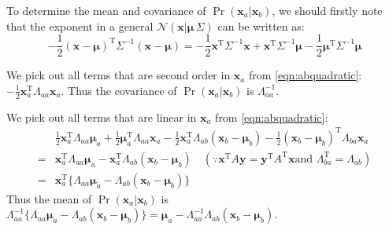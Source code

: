 To determine the mean and covariance of
$\Pr(\mathbf{x}_{a}\vert\mathbf{x}_{b})$, we should firstly note that
the exponent in a general
$\mathcal{N}(\mathbf{x}\vert\boldsymbol{\mu}\,\Sigma)$ can be written
as:
\begin{equation}
-\frac{1}{2}(\mathbf{x}-\boldsymbol{\mu})^{\mathrm{T}}\Sigma^{-1}(\mathbf{x}-\boldsymbol{\mu})=-\frac{1}{2}\mathbf{x}^{\mathrm{T}}\Sigma^{-1}\mathbf{x}+\mathbf{x}^{\mathrm{T}}\Sigma^{-1}\boldsymbol{\mu}-\frac{1}{2}\boldsymbol{\mu}^{\mathrm{T}}\Sigma^{-1}\boldsymbol{\mu}
\label{eqn:expandexponent}
\end{equation}


We pick out all terms that are second order in $\mathbf{x}_{a}$ from
\eqref{eqn:abquadratic}:
$-\frac{1}{2}\mathbf{x}_{a}^{\mathrm{T}}\Lambda_{aa}\mathbf{x}_{a}$.
Thus the covariance of $\Pr(\mathbf{x}_{a}\vert\mathbf{x}_{b})$ is
$\Lambda_{aa}^{-1}$.


We pick out all terms that are linear in $\mathbf{x}_{a}$ from
\eqref{eqn:abquadratic}:
\begin{equation}
\begin{split}
&\frac{1}{2}\mathbf{x}_{a}^{\mathrm{T}}\Lambda_{aa}\boldsymbol{\mu}_{a}+\frac{1}{2}\boldsymbol{\mu}_{a}^{\mathrm{T}}\Lambda_{aa}\mathbf{x}_{a}-\frac{1}{2}\mathbf{x}_{a}^{\mathrm{T}}\Lambda_{ab}(\mathbf{x}_{b}-\boldsymbol{\mu}_{b})-\frac{1}{2}(\mathbf{x}_{b}-\boldsymbol{\mu}_{b})^{\mathrm{T}}\Lambda_{ba}\mathbf{x}_{a}\\
=&\mathbf{x}_{a}^{\mathrm{T}}\Lambda_{aa}\boldsymbol{\mu}_{a}-\mathbf{x}_{a}^{\mathrm{T}}\Lambda_{ab}(\mathbf{x}_{b}-\boldsymbol{\mu}_{b})\quad{}(\because{}\mathbf{x}^{\mathrm{T}}A\mathbf{y}=\mathbf{y}^{\mathrm{T}}A^{\mathrm{T}}\mathbf{x}\text{
        and }\Lambda_{ba}^{\mathrm{T}}=\Lambda_{ab})\\
=&\mathbf{x}_{a}^{\mathrm{T}}\{\Lambda_{aa}\boldsymbol{\mu}_{a}-\Lambda_{ab}(\mathbf{x}_{b}-\boldsymbol{\mu}_{b})\}
\end{split}
\label{eqn:linearinxa}
\end{equation}
Thus the mean of $\Pr(\mathbf{x}_{a}\vert\mathbf{x}_b)$ is
$\Lambda_{aa}^{-1}\{\Lambda_{aa}\boldsymbol{\mu}_{a}-\Lambda_{ab}(\mathbf{x}_{b}-\boldsymbol{\mu}_{b})\}=\boldsymbol{\mu}_{a}-\Lambda_{aa}^{-1}\Lambda_{ab}(\mathbf{x}_{b}-\boldsymbol{\mu}_{b})$.


